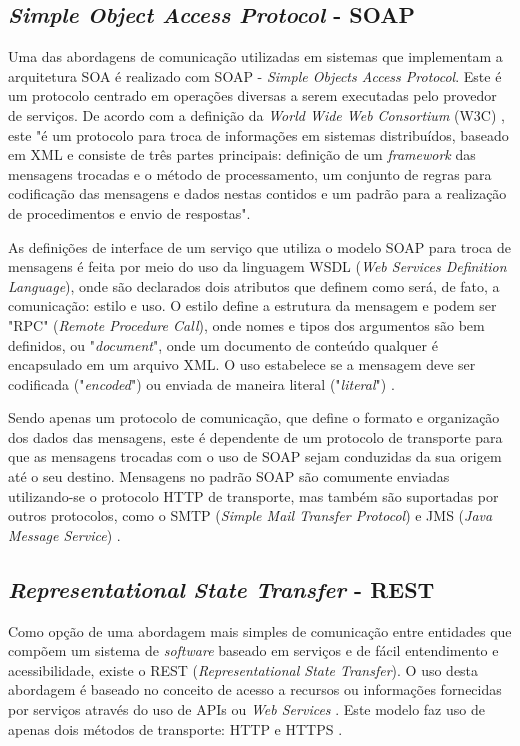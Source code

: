 \subsection{\textit{Simple Object Access Protocol} - SOAP}
Uma das abordagens de comunicação utilizadas em sistemas que implementam a arquitetura SOA é realizado com SOAP - \textit{Simple Objects Access Protocol}. Este é um protocolo centrado em operações diversas a serem executadas pelo provedor de serviços. De acordo com a definição da \textit{World Wide Web Consortium} (W3C) \cite{box_simple_2000}, este "é um protocolo para troca de informações em sistemas distribuídos, baseado em XML e consiste de três partes principais: definição de um \textit{framework} das mensagens trocadas e o método de processamento, um conjunto de regras para codificação das mensagens e dados nestas contidos e um padrão para a realização de procedimentos e envio de respostas".

As definições de interface de um serviço que utiliza o modelo SOAP para troca de mensagens é feita por meio do uso da linguagem WSDL (\textit{Web Services Definition Language}), onde são declarados dois atributos que definem como será, de fato, a comunicação: estilo e uso. O estilo define a estrutura da mensagem e podem ser "RPC" (\textit{Remote Procedure Call}), onde nomes e tipos dos argumentos são bem definidos, ou "\textit{document}", onde um documento de conteúdo qualquer é encapsulado em um arquivo XML. O uso estabelece se a mensagem deve ser codificada ("\textit{encoded}") ou enviada de maneira literal ("\textit{literal}") \cite{Bianco2007}.

Sendo apenas um protocolo de comunicação, que define o formato e organização dos dados das mensagens, este é dependente de um protocolo de transporte para que as mensagens trocadas com o uso de SOAP sejam conduzidas da sua origem até o seu destino. Mensagens no padrão SOAP são comumente enviadas utilizando-se o protocolo HTTP de transporte, mas também são suportadas por outros protocolos, como o SMTP (\textit{Simple Mail Transfer Protocol}) e JMS (\textit{Java Message Service}) \cite{mueller_understanding_2013}.

\subsection{\textit{Representational State Transfer} - REST}
Como opção de uma abordagem mais simples de comunicação entre entidades que compõem um sistema de \textit{software} baseado em serviços e de fácil entendimento e acessibilidade, existe o REST (\textit{Representational State Transfer}). O uso desta abordagem é baseado no conceito de acesso a recursos ou informações fornecidas por serviços através do uso de APIs ou \textit{Web Services} \cite{Bianco2007}. Este modelo faz uso de apenas dois métodos de transporte: HTTP e HTTPS \cite{rozlog_restesoap_2013}.

